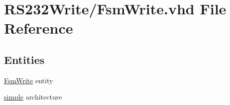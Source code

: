 \hypertarget{_fsm_write_8vhd}{}\section{R\+S232\+Write/\+Fsm\+Write.vhd File Reference}
\label{_fsm_write_8vhd}
\subsection*{Entities}
\begin{DoxyCompactItemize}
\item 
\hyperlink{class_fsm_write}{Fsm\+Write} entity
\item 
\hyperlink{class_fsm_write_1_1simple}{simple} architecture
\end{DoxyCompactItemize}
